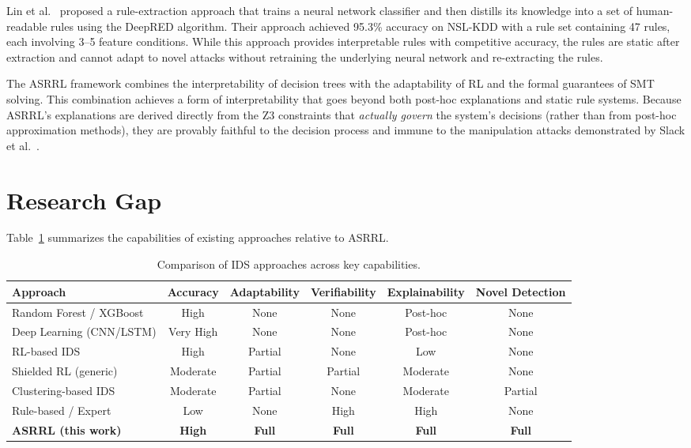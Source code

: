 \documentclass[12pt, letterpaper, oneside]{report}
\newcommand{\ASRRL}{\textsc{ASRRL}}
\begin{document}
Lin et al.~\citep{lin2022} proposed a rule-extraction approach that trains a neural network classifier and then distills its knowledge into a set of human-readable rules using the DeepRED algorithm. Their approach achieved 95.3\% accuracy on NSL-KDD with a rule set containing 47 rules, each involving 3--5 feature conditions. While this approach provides interpretable rules with competitive accuracy, the rules are static after extraction and cannot adapt to novel attacks without retraining the underlying neural network and re-extracting the rules.

The \ASRRL{} framework combines the interpretability of decision trees with the adaptability of RL and the formal guarantees of SMT solving. This combination achieves a form of interpretability that goes beyond both post-hoc explanations and static rule systems. Because \ASRRL{}'s explanations are derived directly from the Z3 constraints that \emph{actually govern} the system's decisions (rather than from post-hoc approximation methods), they are provably faithful to the decision process and immune to the manipulation attacks demonstrated by Slack et al.~\citep{slack2020}.


\section{Research Gap}
\label{sec:lit_gap}

Table~\ref{tab:lit_comparison} summarizes the capabilities of existing approaches relative to \ASRRL{}.

\begin{table}[htbp]
\centering
\caption{Comparison of IDS approaches across key capabilities.}
\label{tab:lit_comparison}
\small
\begin{tabular}{lccccc}
\toprule
\textbf{Approach} & \textbf{Accuracy} & \textbf{Adaptability} & \textbf{Verifiability} & \textbf{Explainability} & \textbf{Novel Detection} \\
\midrule
Random Forest / XGBoost & High & None & None & Post-hoc & None \\
Deep Learning (CNN/LSTM) & Very High & None & None & Post-hoc & None \\
RL-based IDS & High & Partial & None & Low & None \\
Shielded RL (generic) & Moderate & Partial & Partial & Moderate & None \\
Clustering-based IDS & Moderate & Partial & None & Moderate & Partial \\
Rule-based / Expert & Low & None & High & High & None \\
\midrule
\textbf{ASRRL (this work)} & \textbf{High} & \textbf{Full} & \textbf{Full} & \textbf{Full} & \textbf{Full} \\
\bottomrule
\end{tabular}
\end{table}
\end{document}
